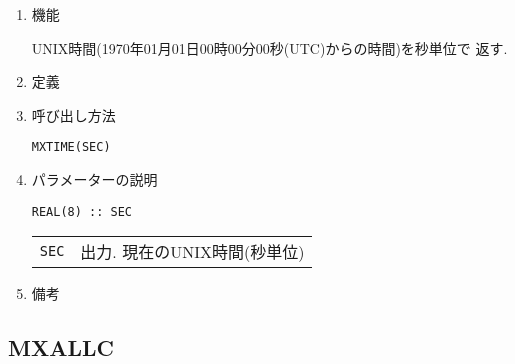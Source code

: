 \documentclass[a4j]{jsarticle}
\begin{document}
\begin{enumerate}

\item 機能 

UNIX時間(1970年01月01日00時00分00秒(UTC)からの時間)を秒単位で
返す.

\item 定義

\item 呼び出し方法 
    
\texttt{MXTIME(SEC)}
  
\item パラメーターの説明

  \vspace{-2ex}

\begin{verbatim}
REAL(8) :: SEC
\end{verbatim}

  \vspace{-1ex}
  
\begin{tabular}{ll}
\texttt{SEC} & 出力. 現在のUNIX時間(秒単位)
\end{tabular}

\item 備考

\end{enumerate}


\subsection{MXALLC}
\end{document}
